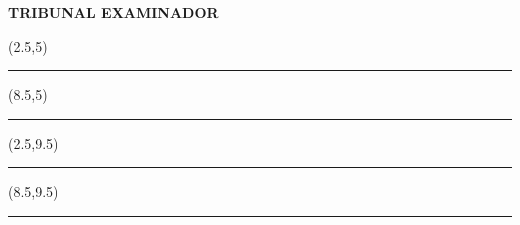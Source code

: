 
\newpage
\begin{center}
   \textbf{TRIBUNAL EXAMINADOR} 

    \begin{textblock}{5}(2.5,5)
    \noindent\rule{6.5cm}{0.4pt}
    \end{textblock}
    
    \begin{textblock}{5}(8.5,5)
    \noindent\rule{6.5cm}{0.4pt}
    \end{textblock}
    
    \begin{textblock}{5}(2.5,9.5)
    \noindent\rule{6.5cm}{0.4pt}
    \end{textblock}
    
    \begin{textblock}{5}(8.5,9.5)
    \noindent\rule{6.5cm}{0.4pt}
    \end{textblock}

\end{center}
